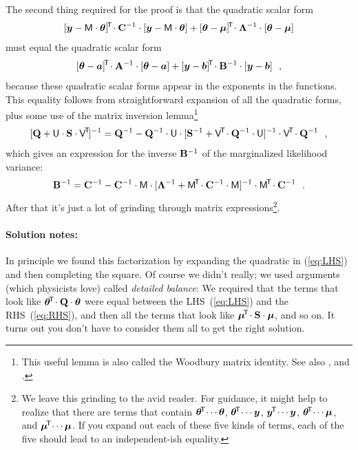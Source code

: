 The second thing required for the proof is that the quadratic scalar form
\begin{equation}\label{eq:LHS}
[\boldsymbol{y}-\mathsf{M}\cdot\boldsymbol{\theta}]^{\!\mathsf{T}\!}\cdot\mathbf{C}^{-1}\cdot[\boldsymbol{y}-\mathsf{M}\cdot\boldsymbol{\theta}]
+ [\boldsymbol{\theta}-\boldsymbol{\mu}]^{\!\mathsf{T}\!}\cdot\mathbf{\Lambda}^{-1}\cdot[\boldsymbol{\theta}-\boldsymbol{\mu}]
\end{equation}
must equal the quadratic scalar form
\begin{equation}\label{eq:RHS}
[\boldsymbol{\theta}-\boldsymbol{a}]^{\!\mathsf{T}\!}\cdot\mathbf{A}^{-1}\cdot[\boldsymbol{\theta}-\boldsymbol{a}]
+ [\boldsymbol{y}-\boldsymbol{b}]^{\!\mathsf{T}\!}\cdot\mathbf{B}^{-1}\cdot[\boldsymbol{y}-\boldsymbol{b}]
~~,
\end{equation}
because these quadratic scalar forms appear in the exponents in the functions.
This equality follows from straightforward expansion of
all the quadratic forms, plus some use of the matrix inversion lemma\footnote{This
  useful lemma is also called the Woodbury matrix identity. See also \cite{wiki:MIL},
  and \cite{Harville:2011}.}
\begin{equation}\label{eq:invlemma}
[\mathbf{Q} + \mathsf{U}\cdot\mathbf{S}\cdot\mathsf{V}^{\!\mathsf{T}\!}]^{-1} = \mathbf{Q}^{-1} - \mathbf{Q}^{-1}\cdot\mathsf{U}\cdot[\mathbf{S}^{-1} + \mathsf{V}^{\!\mathsf{T}\!}\cdot\mathbf{Q}^{-1}\cdot\mathsf{U}]^{-1}\cdot\mathsf{V}^{\!\mathsf{T}\!}\cdot\mathbf{Q}^{-1}
~~,
\end{equation}
which gives an expression for the inverse $\mathbf{B}^{-1}$ of the marginalized
likelihood variance:
\begin{equation}
\mathbf{B}^{-1} = \mathbf{C}^{-1} - \mathbf{C}^{-1}\cdot\mathsf{M}\cdot[\mathbf{\Lambda}^{-1} + \mathsf{M}^{\!\mathsf{T}\!}\cdot\mathbf{C}^{-1}\cdot\mathsf{M}]^{-1}\cdot\mathsf{M}^{\!\mathsf{T}\!}\cdot\mathbf{C}^{-1}
~~.
\end{equation}
After that it's just a lot of grinding through matrix expressions\footnote{%
We leave this grinding to the avid reader.
For guidance, it might help to realize that there are terms that
contain $\boldsymbol{\theta}^{\!\mathsf{T}\!}\cdots\boldsymbol{\theta}$, $\boldsymbol{\theta}^{\!\mathsf{T}\!}\cdots\boldsymbol{y}$, $\boldsymbol{y}^{\!\mathsf{T}\!}\cdots\boldsymbol{y}$,
$\boldsymbol{\theta}^{\!\mathsf{T}\!}\cdots\boldsymbol{\mu}$, and $\boldsymbol{\mu}^{\!\mathsf{T}\!}\cdots\boldsymbol{\mu}$.
If you expand out each of these five kinds of terms, each of the five
should lead to an independent-ish equality.}.

\paragraph{Solution notes:}
In principle we found this factorization by expanding the quadratic in
(\ref{eq:LHS}) and then completing the square.
Of course we didn't really; we used arguments (which physicists love)
called \emph{detailed balance}:
We required that the terms that look like
$\boldsymbol{\theta}^{\!\mathsf{T}\!}\cdot\mathbf{Q}\cdot\boldsymbol{\theta}$ were equal between the LHS~(\ref{eq:LHS})
and the RHS~(\ref{eq:RHS}), and then all the terms that look like
$\boldsymbol{\mu}^{\!\mathsf{T}\!}\cdot\mathbf{S}\cdot\boldsymbol{\mu}$, and so on.
It turns out you don't have to consider them all to get the right solution.

